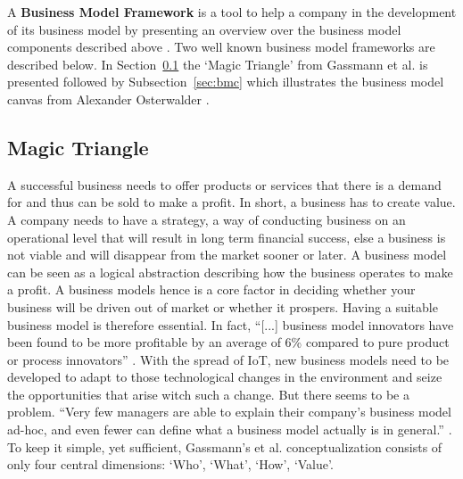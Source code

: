  		A \textbf{Business Model Framework} is a tool to help a company in the development of its business model by presenting an overview over the business model components described above \cite{dijkman}. Two well known business model frameworks are described below. In Section~\ref{sec:mt} the `Magic Triangle' from Gassmann et al. \cite{gassmann55} is presented followed by Subsection~\ref{sec:bmc} which illustrates the business model canvas from Alexander Osterwalder \cite{osterwalder}.
 	\vspace{10mm}
	\subsection{Magic Triangle}
	\label{sec:mt}
		A successful business needs to offer products or services that there is a demand for and thus can be sold to make a profit. In short, a business has to create value. A company needs to have a strategy, a way of conducting business on an operational level that will result in long term financial success, else a business is not viable and will disappear from the market sooner or later. A business model can be seen as a logical abstraction describing how the business operates to make a profit. A business models hence is a core factor in deciding whether your business will be driven out of market or whether it prospers. Having a suitable business model is therefore essential. In fact, ``[...] business model innovators have been found to be more profitable by an average of 6\% compared to pure product or process innovators'' \cite[p.~90]{gassmann55}. With the spread of IoT, new business models need to be developed to adapt to those technological changes in the environment and seize the opportunities that arise witch such a change. But there seems to be a problem. ``Very few managers are able to explain their company's business model ad-hoc, and even fewer can define what a business model actually is in general.'' \cite[p.~90]{gassmann55}. To keep it simple, yet sufficient, Gassmann's et al. conceptualization consists of only four central dimensions: `Who', `What', `How', `Value'. 

